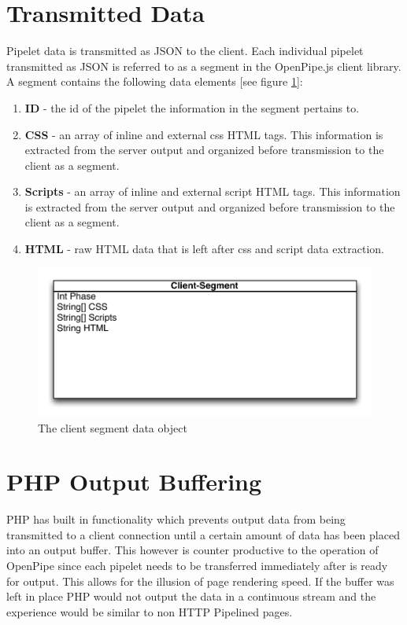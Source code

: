 \documentclass[12pt]{report}
\begin{document}
\section{Transmitted Data}
Pipelet data is transmitted as JSON to the client. Each individual pipelet transmitted as JSON is referred to as a segment in the OpenPipe.js client library. A segment contains the following data elements [see figure \ref{fig:clientSegmentDataObject}]:

\begin{enumerate}
\item \textbf{ID} - the id of the pipelet the information in the segment pertains to. 
\item \textbf{CSS} - an array of inline and external css HTML tags. This information is extracted from the server output and organized before transmission to the client as a segment.
\item \textbf{Scripts} - an array of inline and external script HTML tags. This information is extracted from the server output and organized before transmission to the client as a segment.
\item \textbf{HTML} - raw HTML data that is left after css and script data extraction.
\end{enumerate}

\begin{figure}[H]
\label{fig:clientSegmentDataObject}
\centering
\includegraphics[width=\textwidth,keepaspectratio]{figures/images/client_segment_data_object.pdf}
\caption{The client segment data object}
\end{figure}

\section{PHP Output Buffering}
PHP has built in functionality which prevents output data from being transmitted
to a client connection until a certain amount of data has been placed into an output buffer. This however is counter productive to the operation of OpenPipe since each pipelet needs to be transferred immediately after is ready for output. This allows for the illusion of page rendering speed. If the buffer was left in place PHP would not output the data in a continuous stream and the experience would be similar to non HTTP Pipelined pages. 
\end{document}
